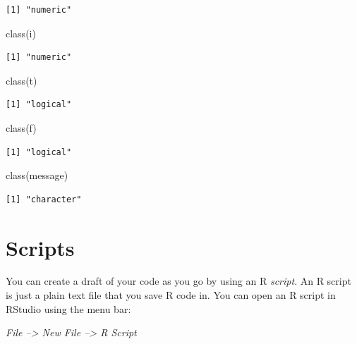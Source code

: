 \documentclass[
  letterpaper,
  DIV=11,
  numbers=noendperiod]{scrreprt}
\newenvironment{Shaded}{\begin{snugshade}}{\end{snugshade}}
\newcommand{\FunctionTok}[1]{\textcolor[rgb]{0.28,0.35,0.67}{#1}}
\newcommand{\NormalTok}[1]{\textcolor[rgb]{0.00,0.23,0.31}{#1}}
\begin{document}
\begin{verbatim}
[1] "numeric"
\end{verbatim}

\begin{Shaded}
\begin{Highlighting}[]
\FunctionTok{class}\NormalTok{(i)}
\end{Highlighting}
\end{Shaded}

\begin{verbatim}
[1] "numeric"
\end{verbatim}

\begin{Shaded}
\begin{Highlighting}[]
\FunctionTok{class}\NormalTok{(t)}
\end{Highlighting}
\end{Shaded}

\begin{verbatim}
[1] "logical"
\end{verbatim}

\begin{Shaded}
\begin{Highlighting}[]
\FunctionTok{class}\NormalTok{(f)}
\end{Highlighting}
\end{Shaded}

\begin{verbatim}
[1] "logical"
\end{verbatim}

\begin{Shaded}
\begin{Highlighting}[]
\FunctionTok{class}\NormalTok{(message)}
\end{Highlighting}
\end{Shaded}

\begin{verbatim}
[1] "character"
\end{verbatim}

\section{Scripts}\label{scripts}

You can create a draft of your code as you go by using an R
\emph{script}. An R script is just a plain text file that you save R
code in. You can open an R script in RStudio using the menu bar:

\emph{File --\textgreater{} New File --\textgreater{} R Script}
\end{document}
